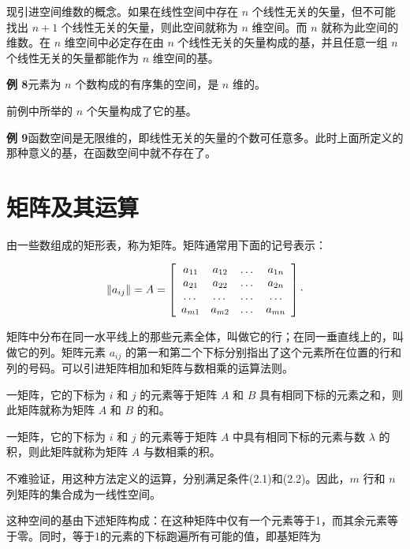 现引进空间维数的概念。如果在线性空间中存在 $n$ 个线性无关的矢量，但不可能找出 $n+1$ 个线性无关的矢量，则此空间就称为 $n$ 维空间。而 $n$ 就称为此空间的维数。在 $n$ 维空间中必定存在由 $n$ 个线性无关的矢量构成的基，并且任意一组 $n$ 个线性无关的矢量都能作为 $n$ 维空间的基。

\textbf{例 8}\quad 元素为 $n$ 个数构成的有序集的空间，是 $n$ 维的。

前例中所举的 $n$ 个矢量构成了它的基。

\textbf{例 9}\quad 函数空间是无限维的，即线性无关的矢量的个数可任意多。此时上面所定义的那种意义的基，在函数空间中就不存在了。

\section{矩阵及其运算}

由一些数组成的矩形表，称为矩阵。矩阵通常用下面的记号表示：

\begin{equation*}
\| a _ {i j} \| = A = \left[ \begin{array}{c c c c} a _ {1 1} & a _ {1 2} & \dots & a _ {1 n} \\ a _ {2 1} & a _ {2 2} & \dots & a _ {2 n} \\ \dots & \dots & \dots & \dots \\ a _ {m 1} & a _ {m 2} & \dots & a _ {m n} \end{array} \right] \cdot
\end{equation*}

矩阵中分布在同一水平线上的那些元素全体，叫做它的行；在同一垂直线上的，叫做它的列。矩阵元素 $a_{ij}$ 的第一和第二个下标分别指出了这个元素所在位置的行和列的号码。可以引进矩阵相加和矩阵与数相乘的运算法则。

一矩阵，它的下标为 $i$ 和 $j$ 的元素等于矩阵 $A$ 和 $B$ 具有相同下标的元素之和，则此矩阵就称为矩阵 $A$ 和 $B$ 的和。

一矩阵，它的下标为 $i$ 和 $j$ 的元素等于矩阵 $A$ 中具有相同下标的元素与数 $\lambda$ 的积，则此矩阵就称为矩阵 $A$ 与数相乘的积。

不难验证，用这种方法定义的运算，分别满足条件(2.1)和(2.2)。因此，$m$ 行和 $n$ 列矩阵的集合成为一线性空间。

这种空间的基由下述矩阵构成：在这种矩阵中仅有一个元素等于1，而其余元素等于零。同时，等于1的元素的下标跑遍所有可能的值，即基矩阵为

